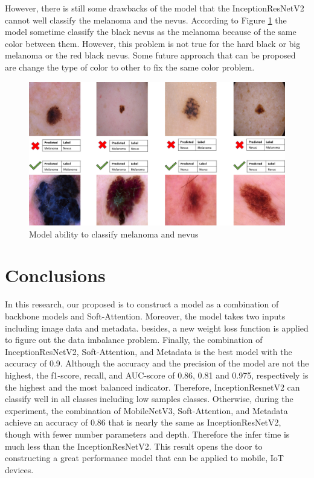\documentclass[sensors,article,submit,pdftex,moreauthors]{Definitions/mdpi}
\begin{document}
However, there is still some drawbacks of the model that the InceptionResNetV2 cannot well classify the melanoma and the nevus. According to Figure \ref{fig:nevusVSmela} the model sometime classify the black nevus as the melanoma because of the same color between them. However, this problem is not true for the hard black or big melanoma or the red black nevus. Some future approach that can be proposed are change the type of color to other to fix the same color problem.

\begin{figure}[H]
	\centering
	\includegraphics[width=1\linewidth]{Definitions/img_class_nevus_mela}
	\caption{Model ability to classify melanoma and nevus}
	\label{fig:nevusVSmela}
\end{figure}

\section{Conclusions}
In this research, our proposed is to construct a model as a combination of backbone models and Soft-Attention. Moreover, the model takes two inputs including image data and metadata. besides, a new weight loss function is applied to figure out the data imbalance problem. Finally, the combination of InceptionResNetV2, Soft-Attention, and Metadata is the best model with the accuracy of 0.9. Although the accuracy and the precision of the model are not the highest, the f1-score, recall, and AUC-score of 0.86, 0.81 and 0.975, respectively is the highest and the most balanced indicator. Therefore, InceptionResnetV2 can classify well in all classes including low samples classes. Otherwise, during the experiment, the combination of MobileNetV3, Soft-Attention, and Metadata achieve an accuracy of 0.86 that is nearly the same as InceptionResNetV2, though with fewer number parameters and depth. Therefore the infer time is much less than the InceptionResNetV2. This result opens the door to constructing a great performance model that can be applied to mobile, IoT devices. 
\vspace{6pt} 
\end{document}
